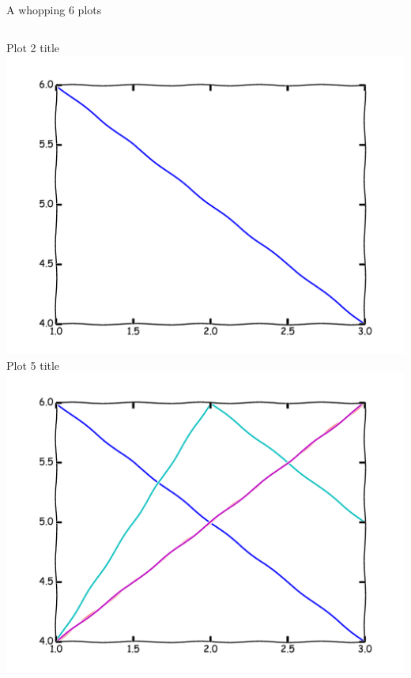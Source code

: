 \begin{frame}{A whopping 6 plots}
\begin{columns}
\begin{column}{0.33\textwidth}
\begin{center}
Plot 2 title
\\
\includegraphics[width=\textwidth]{example/plot2.pdf}
\\
Plot 5 title
\\
\includegraphics[width=\textwidth]{example/plot1.pdf}
\end{center}
\end{column}


\end{columns}
\end{frame}
